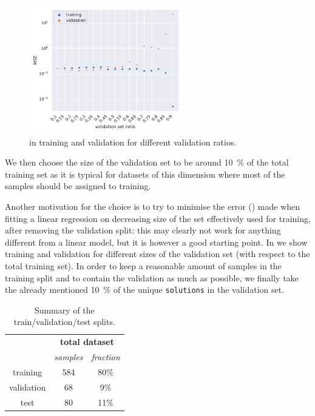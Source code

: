 \begin{figure}[htbp]
  \centering
  \includegraphics[width=0.6\textwidth]{img/valsize_errors}
  \caption{\mse in training and validation for different validation ratios.}
  \label{fig:lumps:validation_size}
\end{figure}

We then choose the size of the validation set to be around \SI{10}{\percent} of the total training set as it is typical for datasets of this dimension where most of the samples should be assigned to training.

Another motivation for the choice is to try to minimise the error (\mse) made when fitting a linear regression on decreasing size of the set effectively used for training, after removing the validation split: this may clearly not work for anything different from a linear model, but it is however a good starting point.
In  we show training and validation \mse for different sizes of the validation set (with respect to the total training set).
In order to keep a reasonable amount of samples in the training split and to contain the validation \mse as much as possible, we finally take the already mentioned \SI{10}{\percent} of the unique \texttt{solutions} in the validation set.

\begin{table}[htbp]
\centering
\begin{tabular}{@{}ccc@{}}
\toprule
           & \multicolumn{2}{c}{\textbf{total dataset}} \\
           & \textit{samples}    & \textit{fraction}    \\
\midrule
training   & 584                 & 80\%                 \\
validation & 68                  & 9\%                  \\
test       & 80                  & 11\%                 \\
\bottomrule
\end{tabular}
\caption{Summary of the train/validation/test splits.}
\label{tab:lumps:splits}
\end{table}

